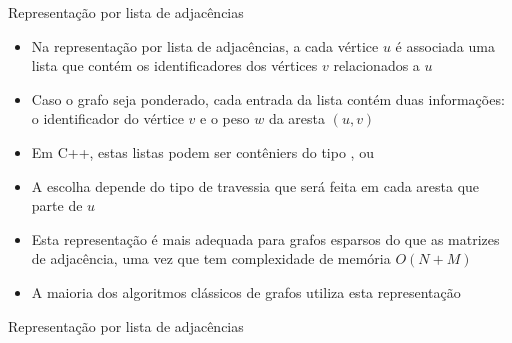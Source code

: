 \begin{frame}[fragile]{Representação por lista de adjacências}

    \begin{itemize}
        \item Na representação por lista de adjacências, a cada vértice $u$ é associada uma lista
            que contém os identificadores dos vértices $v$ relacionados a $u$

        \item Caso o grafo seja ponderado, cada entrada da lista contém duas informações: o 
            identificador do vértice $v$ e o peso $w$ da aresta $(u, v)$

        \item Em C++, estas listas podem ser contêniers do tipo , 
            ou 

        \item A escolha depende do tipo de travessia que será feita em cada aresta que parte de $u$

        \item Esta representação é mais adequada para grafos esparsos do que as matrizes de 
            adjacência, uma vez que tem complexidade de memória $O(N + M)$

        \item A maioria dos algoritmos clássicos de grafos utiliza esta representação
    \end{itemize}

\end{frame}



\begin{frame}[fragile]{Representação por lista de adjacências}
\end{frame}

